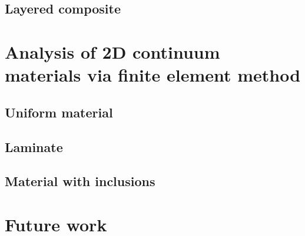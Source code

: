 \documentclass{article}
\begin{document}
\subsection{Layered composite}

\section{Analysis of 2D continuum materials via finite element method}

\subsection{Uniform material}

\subsection{Laminate}

\subsection{Material with inclusions}

\section{Future work}

\end{document}
